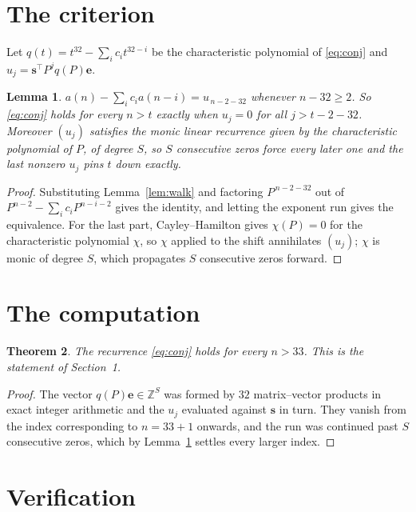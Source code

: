 \documentclass[11pt,a4paper]{article}
\theoremstyle{plain}
\newtheorem{theorem}{Theorem}
\newtheorem{lemma}[theorem]{Lemma}
\theoremstyle{definition}
\begin{document}
\section{The criterion}

Let $q(t)=t^{32}-\sum_i c_i t^{32-i}$ be the characteristic polynomial of
\eqref{eq:conj} and $u_j=\mathbf{s}^{\!\top}P^{j}q(P)\mathbf{e}$.

\begin{lemma}\label{lem:crit}
$a(n)-\sum_i c_i a(n-i)=u_{\,n-2-32}$ whenever $n-32\ge2$. So \eqref{eq:conj}
holds for every $n>t$ exactly when $u_j=0$ for all $j>t-2-32$. Moreover $(u_j)$
satisfies the monic linear recurrence given by the characteristic polynomial of $P$, of
degree $S$, so $S$ consecutive zeros force every later one and the last nonzero $u_j$ pins
$t$ down exactly.
\end{lemma}

\begin{proof}
Substituting Lemma~\ref{lem:walk} and factoring $P^{\,n-2-32}$ out of
$P^{n-2}-\sum_i c_i P^{n-i-2}$ gives the identity, and letting the exponent run gives the
equivalence. For the last part, Cayley--Hamilton gives $\chi(P)=0$ for the characteristic
polynomial $\chi$, so $\chi$ applied to the shift annihilates $(u_j)$; $\chi$ is monic of
degree $S$, which propagates $S$ consecutive zeros forward.
\end{proof}

\section{The computation}

\begin{theorem}
The recurrence \eqref{eq:conj} holds for every $n>33$. This is the statement of
Section~1.
\end{theorem}

\begin{proof}
The vector $q(P)\mathbf{e}\in\mathbb{Z}^{S}$ was formed by $32$ matrix--vector
products in exact integer arithmetic and the $u_j$ evaluated against $\mathbf{s}$ in turn.
They vanish from the index corresponding to $n=33+1$ onwards, and the run was continued
past $S$ consecutive zeros, which by Lemma~\ref{lem:crit} settles every larger index.
\end{proof}

\section{Verification}
\end{document}
